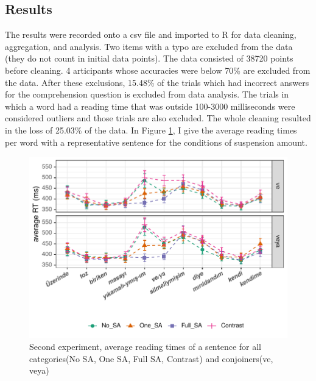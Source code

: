 \subsection{Results}

The results were recorded onto a csv file and imported to R \citep{team2013r} for data cleaning, aggregation, and analysis. Two items with a typo are excluded from the data (they do not count in initial data points). The data consisted of 38720 points before cleaning. 4 articipants whose accuracies were below 70\% are excluded from the data. After these exclusions, 15.48\% of the trials which had incorrect answers for the comprehension question is excluded from data analysis. The trials in which a word had a reading time that was outside 100-3000 milliseconds were considered outliers and those trials are also excluded. The whole cleaning resulted in the loss of 25.03\% of the data. In Figure \ref{fig:secondplot}, I give the average reading times per word with a representative sentence for the conditions of suspension amount.

\begin{knitrout}
\color{fgcolor}\begin{figure}[hbt!]

{\centering \includegraphics[]{experiments/selfpaced/report/figure/secondplot-1.pdf} 

}

\caption[Second experiment, average reading times of a sentence for all categories(No SA, One SA, Full SA, Contrast) and conjoiners(ve, veya)]{Second experiment, average reading times of a sentence for all categories(No SA, One SA, Full SA, Contrast) and conjoiners(ve, veya)}\label{fig:secondplot}
\end{figure}


\end{knitrout}

